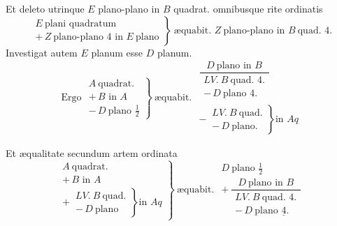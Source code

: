 \documentclass[11pt,a4paper]{article}
\begin{document}
Et deleto utrinque $E$ plano-plano in $B$ quadrat. omnibusque rite ordinatis
\[ \left.\begin{array}{l} E\ \text{plani quadratum} \\ +\,Z\ \text{plano-plano } 4 \text{ in } E\ \text{plano} \end{array}\right\}\ \text{æquabit. } Z\ \text{plano-plano in } B\ \text{quad. } 4. \]
Investigat autem $E$ planum esse $D$ planum.
\[ \text{Ergo } \left.\begin{array}{l} A\ \text{quadrat.} \\ +\,B \text{ in } A \\ -\,D\ \text{plano } \frac{1}{2} \end{array}\right\}\ \text{æquabit. } \begin{array}{l} \dfrac{D\ \text{plano in } B}{\begin{array}{l} LV.\ B\ \text{quad. } 4. \\ -\,D\ \text{plano } 4. \end{array}} \\[2ex] -\,\left.\begin{array}{l} LV.\ B\ \text{quad.} \\ -\,D\ \text{plano.} \end{array}\right\} \text{in } Aq \end{array} \]

Et æqualitate secundum artem ordinata
\[ \left.\begin{array}{l} A\ \text{quadrat.} \\ +\,B \text{ in } A \\ +\,\left.\begin{array}{l} LV.\ B\ \text{quad.} \\ -\,D\ \text{plano} \end{array}\right\} \text{in } Aq \end{array}\right\}\ \text{æquabit. } \begin{array}{l} D\ \text{plano } \frac{1}{2} \\ +\,\dfrac{D\ \text{plano in } B}{\begin{array}{l} LV.\ B\ \text{quad. } 4. \\ -\,D\ \text{plano } \underline{4}. \end{array}} \end{array} \]
\end{document}
